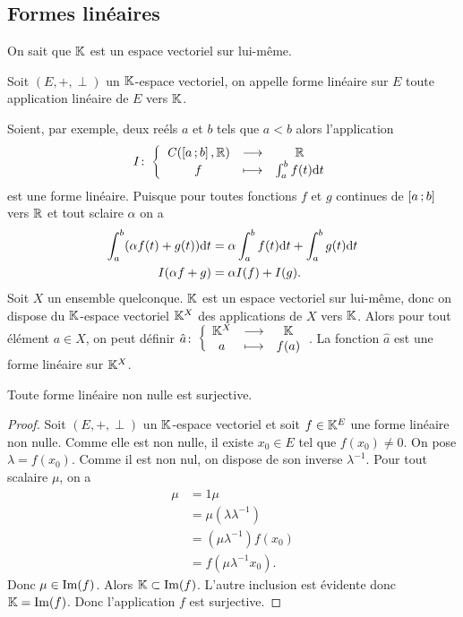 \subsection{Formes linéaires}
On sait que \(\mathbb{K}\) est un espace vectoriel sur lui-même.
\begin{defdef}
  Soit \((E,+,\perp)\) un \(\mathbb{K}\)-espace vectoriel, on appelle forme linéaire sur \(E\) toute application linéaire de \(E\) vers \(\mathbb{K}\).
\end{defdef}

Soient, par exemple, deux reéls \(a\) et \(b\) tels que \(a<b\) alors l'application
\begin{equation}
 I\colon \left\{\begin{array}{ccc} \mathit{C}(\left[ a \, ;  b \right],\mathbb{R}) & \longrightarrow &\mathbb{R}\\ f & \longmapsto & \int_{a}^b f(t)\mathrm{d} t \end{array} \right.
\end{equation}
est une forme linéaire. Puisque pour toutes fonctions \(f\) et \(g\) continues de \(\left[ a \, ;  b \right]\) vers \(\mathbb{R}\) et tout sclaire \(\alpha\) on a
\begin{align}
  \int_{a}^b (\alpha f(t)+g(t))\mathrm{d} t &= \alpha \int_{a}^b f(t)\mathrm{d} t + \int_{a}^b g(t)\mathrm{d} t \\
  I(\alpha f+g)&=\alpha I(f)+I(g).
\end{align}
Soit \(X\) un ensemble quelconque. \(\mathbb{K}\) est un espace vectoriel sur lui-même, donc on dispose du \(\mathbb{K}\)-espace vectoriel \(\mathbb{K}^X\) des applications de \(X\) vers \(\mathbb{K}\). Alors pour tout élément \(a \in X\), on peut définir \(\hat{a}\colon \left\{\begin{array}{ccc} \mathbb{K}^X & \longrightarrow &\mathbb{K}\\ a & \longmapsto & f(a) \end{array} \right.\). La fonction \(\hat{a}\) est une forme linéaire sur \(\mathbb{K}^X\).
\begin{theo}
  Toute forme linéaire non nulle est surjective.
\end{theo}
\begin{proof}
  Soit \((E,+,\perp)\) un \(\mathbb{K}\)-espace vectoriel et soit \(f \in \mathbb{K}^E\) une forme linéaire non nulle. Comme elle est non nulle, il existe \(x_0 \in E\) tel que \(f(x_0)\neq 0\). On pose \(\lambda =f(x_0)\). Comme il est non nul, on dispose de son inverse \(\lambda^{-1}\). Pour tout scalaire \(\mu\), on a
  \begin{align}
    \mu & =1 \mu \\
    &= \mu (\lambda \lambda^{-1})\\
    &=(\mu\lambda^{-1})f(x_0)\\
    &=f(\mu\lambda^{-1}x_0).
  \end{align}
  Donc \(\mu \in \operatorname{Im}(f)\). Alors \(\mathbb{K} \subset \operatorname{Im}(f)\). L'autre inclusion est évidente donc \(\mathbb{K}=\operatorname{Im}(f)\). Donc l'application \(f\) est surjective.
\end{proof}

